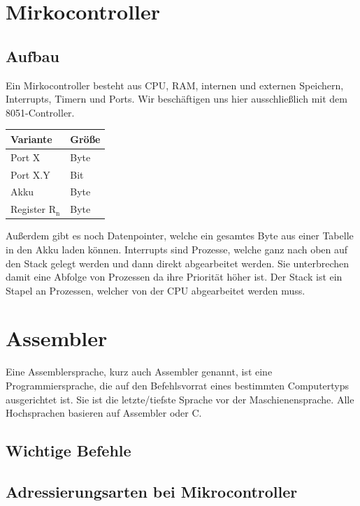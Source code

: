 \documentclass[12pt,a4paper]{article}
\begin{document}
\section{Mirkocontroller}

\subsection{Aufbau}
    Ein Mirkocontroller besteht aus CPU, RAM, internen und externen Speichern, Interrupts, Timern und Ports.
    Wir beschäftigen uns hier ausschließlich mit dem 8051-Controller.
    \begin{table}[h]
        \centering
        \begin{tabularx}{17cm}{|X|X|}
            \hline
            \textbf{Variante} & \textbf{Größe}\\
            \hline
            Port X & Byte\\
            \hline
            Port X.Y & Bit\\
            \hline
            Akku & Byte\\
            \hline
            Register $\text{R}_{\text{n}}$ & Byte\\
            \hline
        \end{tabularx}
    \end{table}
    Außerdem gibt es noch Datenpointer, welche ein gesamtes Byte aus einer Tabelle in den Akku laden können.
    Interrupts sind Prozesse, welche ganz nach oben auf den Stack gelegt werden und dann direkt abgearbeitet werden. Sie unterbrechen damit eine Abfolge von Prozessen da ihre Priorität höher ist. Der Stack ist ein Stapel an Prozessen, welcher von der CPU abgearbeitet werden muss.

\section{Assembler}
    Eine Assemblersprache, kurz auch Assembler genannt, ist eine Programmiersprache, die auf den Befehlsvorrat eines
    bestimmten Computertyps ausgerichtet ist. Sie ist die letzte/tiefste Sprache vor der Maschienensprache. Alle Hochsprachen basieren auf Assembler oder C.

\subsection{Wichtige Befehle}

\subsection{Adressierungsarten bei Mikrocontroller}
\end{document}
